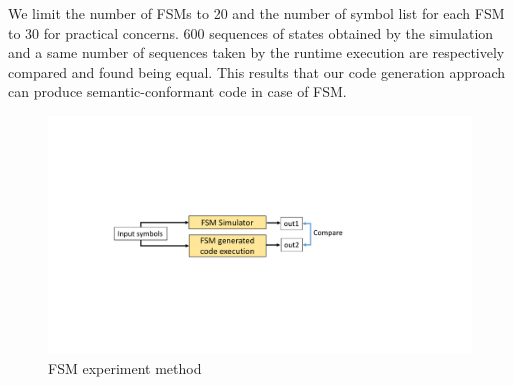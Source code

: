 We limit the number of FSMs to 20 and the number of symbol list for each FSM to 30 for practical concerns. 600 sequences of states obtained by the simulation and a same number of sequences taken by the runtime execution are respectively compared and found being equal. This results that our code generation approach can produce semantic-conformant code in case of FSM.

\begin{figure}
	\centering
	\includegraphics[clip, trim=4.5cm 7.6cm 10.25cm 8.0cm, width=0.85\columnwidth]{figures/fsm}
	\caption{FSM experiment method} 
	\label{fig:fsm}
\end{figure}
